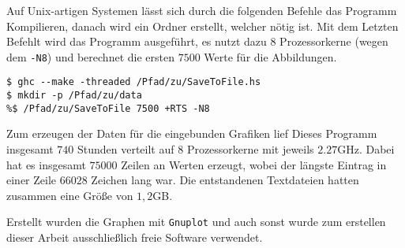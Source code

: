 Auf Unix-artigen Systemen lässt sich durch die folgenden Befehle das Programm
Kompilieren, danach wird ein Ordner erstellt, welcher nötig ist. Mit dem
Letzten Befehlt wird das Programm ausgeführt, es nutzt dazu 8 Prozessorkerne
(wegen dem \texttt{-N8}) und berechnet die ersten $7500$ Werte für die
Abbildungen.
\begin{lstlisting}[style=Bash]
$ ghc --make -threaded /Pfad/zu/SaveToFile.hs
$ mkdir -p /Pfad/zu/data
%$ /Pfad/zu/SaveToFile 7500 +RTS -N8
\end{lstlisting}
Zum erzeugen der Daten für die eingebunden Grafiken lief Dieses Programm
insgesamt $740$ Stunden verteilt auf $8$ Prozessorkerne mit jeweils
$2.27$GHz.
Dabei hat es insgesamt $75000$ Zeilen an Werten erzeugt, wobei der längste
Eintrag in einer Zeile $66028$ Zeichen lang war.
Die entstandenen Textdateien hatten zusammen eine Größe von $1,2$GB.

Erstellt wurden die Graphen mit \texttt{Gnuplot} und auch sonst wurde zum
erstellen dieser Arbeit ausschließlich freie Software verwendet.


